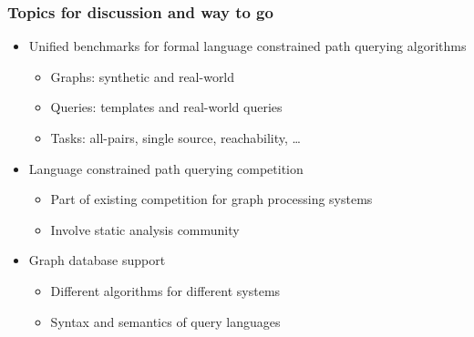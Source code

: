 \documentclass[xcolor=table,aspectratio=169]{beamer}
\begin{document}
\begin{frame}[fragile]
  \frametitle{Topics for discussion and way to go}
  \begin{itemize}
    \item Unified benchmarks for formal language constrained path querying algorithms
    \begin{itemize}
      \item Graphs: synthetic and real-world
      \item Queries: templates and real-world queries
      \item Tasks: all-pairs, single source, reachability, \ldots            
    \end{itemize}
    \pause
    \item Language constrained path querying competition
    \begin{itemize}
      \item Part of existing competition for graph processing systems
      \item Involve static analysis community
    \end{itemize}
    \pause
    \item Graph database support
    \begin{itemize}
      \item Different algorithms for different systems
      \item Syntax and semantics of query languages 
    \end{itemize}
  \end{itemize}
\end{frame}
\end{document}
